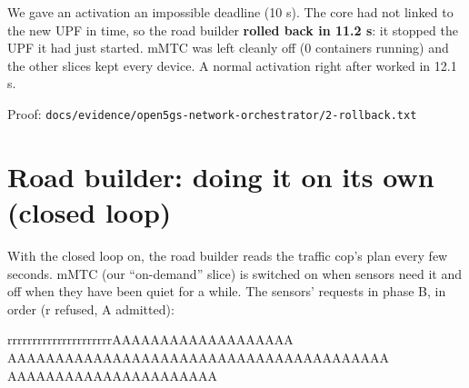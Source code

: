 \documentclass[11pt]{article}
\newcommand{\person}[3][]{%
  \begin{scope}[shift={(#2)},stick,#1]
    \draw (0,1.55) circle (0.22);
    \draw (-0.07,1.6) circle (0.012) (0.07,1.6) circle (0.012);
    \draw (-0.09,1.49) .. controls (-0.03,1.43) and (0.03,1.43) .. (0.09,1.49);
    \draw (0,1.33) -- (0,0.6);
    \draw (0,0.6) -- (-0.25,0) (0,0.6) -- (0.25,0);
    \ifx#3u\draw (0,1.15) -- (-0.35,1.55) (0,1.15) -- (0.35,1.55);\fi
    \ifx#3d\draw (0,1.15) -- (-0.3,0.75) (0,1.15) -- (0.3,0.75);\fi
    \ifx#3p\draw (0,1.15) -- (-0.3,0.75) (0,1.15) -- (0.5,1.2);\fi
    \ifx#3w\draw (0,1.15) -- (-0.3,0.75) (0,1.15) -- (0.3,1.5);\fi
    \ifx#3h\draw (0,1.15) -- (0.35,0.95) -- (0.45,1.05) (0,1.15) -- (-0.3,0.75);\fi
    \ifx#3s\draw (0,1.15) -- (-0.3,1.1) -- (-0.4,1.3) (0,1.15) -- (0.3,1.1) -- (0.4,1.3);\fi
  \end{scope}}
\newcommand{\proof}[1]{\par{\footnotesize\color{grey}Proof: \texttt{#1}}\par}
\begin{document}
We gave an activation an impossible deadline (10 s). The core had not linked to the new UPF in
time, so the road builder \textbf{rolled back in 11.2 s}: it stopped the UPF it had just started.
mMTC was left cleanly off (0 containers running) and the other slices kept every device. A normal
activation right after worked in 12.1 s.

\proof{docs/evidence/open5gs-network-orchestrator/2-rollback.txt}

\section{Road builder: doing it on its own (closed loop)}

\begin{center}
\end{center}

With the closed loop on, the road builder reads the traffic cop's plan every few seconds.
mMTC (our ``on-demand'' slice) is switched on when sensors need it and off when they have been
quiet for a while. The sensors' requests in phase B, in order (\textcolor{bad}{r} refused,
\textcolor{ok}{A} admitted):

{\footnotesize\ttfamily\color{bad}rrrrrrrrrrrrrrrrrrrrr\color{ok}AAAAAAAAAAAAAAAAAAA\\AAAAAAAAAAAAAAAAAAAAAAAAAAAAAAAAAAAAAAAA\\AAAAAAAAAAAAAAAAAAAAAA}
\end{document}
